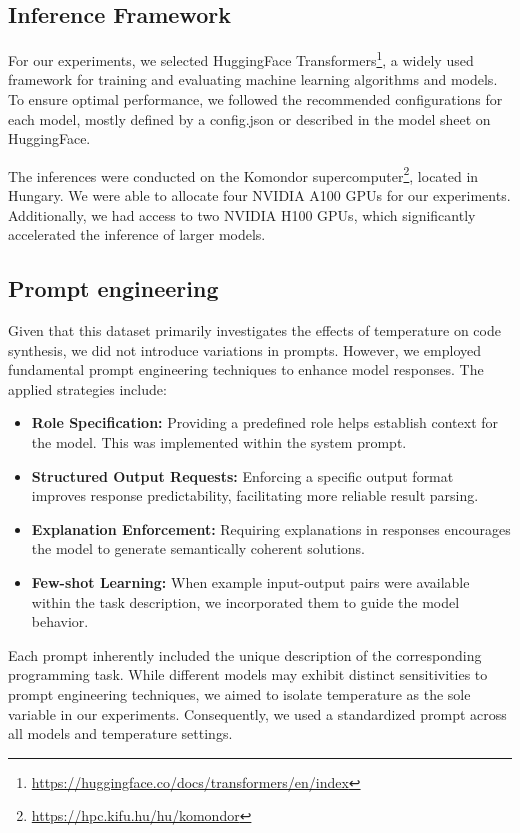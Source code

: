 \subsection{Inference Framework}
\label{th4:section:framework}

For our experiments, we selected HuggingFace Transformers\footnote{\url{https://huggingface.co/docs/transformers/en/index}}, a widely used framework for training and evaluating machine learning algorithms and models.
To ensure optimal performance, we followed the recommended configurations for each model, mostly defined by a config.json or described in the model sheet on HuggingFace.

The inferences were conducted on the Komondor supercomputer\footnote{\url{https://hpc.kifu.hu/hu/komondor}}, located in Hungary.
We were able to allocate four NVIDIA A100 GPUs for our experiments.
Additionally, we had access to two NVIDIA H100 GPUs, which significantly accelerated the inference of larger models.

\subsection{Prompt engineering}

Given that this dataset primarily investigates the effects of temperature on code synthesis, we did not introduce variations in prompts.
However, we employed fundamental prompt engineering techniques to enhance model responses.
The applied strategies include:
\begin{itemize}
	\item \textbf{Role Specification:} Providing a predefined role helps establish context for the model. This was implemented within the system prompt.
	\item \textbf{Structured Output Requests:} Enforcing a specific output format improves response predictability, facilitating more reliable result parsing.
	\item \textbf{Explanation Enforcement:} Requiring explanations in responses encourages the model to generate semantically coherent solutions.
	\item \textbf{Few-shot Learning:} When example input-output pairs were available within the task description, we incorporated them to guide the model behavior.
\end{itemize}
Each prompt inherently included the unique description of the corresponding programming task.
While different models may exhibit distinct sensitivities to prompt engineering techniques, we aimed to isolate temperature as the sole variable in our experiments.
Consequently, we used a standardized prompt across all models and temperature settings.

